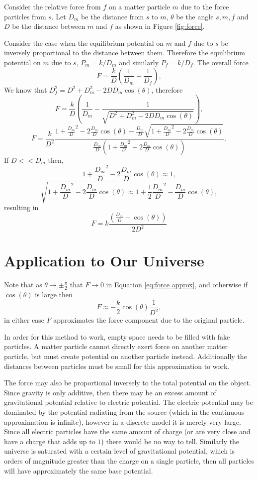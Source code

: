 \documentclass{article}
\begin{document}
Consider the relative force from $f$ on a matter particle $m$ due to the force particles from $s$.
Let $D_m$ be the distance from $s$ to $m$, $\theta$ be the angle $s, m, f$ and $D$ be the distance between $m$ and $f$ as shown in Figure \ref{fig:force}.

Consider the case when the equilibrium potential on $m$ and $f$ due to $s$ be inversely proportional to the distance between them.
Therefore the equilibrium potential on $m$ due to $s$, $P_m = k/D_m$ and similarly $P_f = k/D_f$.
The overall force
$$F = \frac{k}{D}\left(\frac{1}{D_m} - \frac{1}{D_f}\right),$$
We know that $D_f^2 = D^2 + D_m^2 - 2 D D_m \cos(\theta)$, therefore
$$F = \frac{k}{D}\left(\frac{1}{D_m} - \frac{1}{\sqrt{D^2 + D_m^2 - 2 D D_m \cos(\theta)}}\right),$$
$$F = \frac{k}{D^2}
\frac{1 + \frac{D_m}{D}^2 - 2 \frac{D_m}{D} \cos(\theta) - \frac{D_m}{D} \sqrt{1 + \frac{D_m}{D}^2 - 2 \frac{D_m}{D}\cos(\theta)}}
{\frac{D_m}{D}\left(1 + \frac{D_m}{D}^2 - 2 \frac{D_m}{D} \cos(\theta)\right)},
$$
If $D << D_m$ then,
$$1 + \frac{D_m}{D}^2 - 2 \frac{D_m}{D}\cos(\theta) \approx 1,$$
$$\sqrt{1 + \frac{D_m}{D}^2 - 2 \frac{D_m}{D}\cos(\theta)} \approx 1 + \frac{1}{2}\frac{D_m}{D}^2 - \frac{D_m}{D}\cos(\theta),$$
resulting in
\begin{equation}
F = k\frac{\left(\frac{D_m}{D} - \cos\left(\theta\right)\right)}{2D^2}
\label{eq:force approx}
\end{equation}

\section{Application to Our Universe}

Note that as $\theta \to \pm \frac{\pi}{2}$ that $F \to 0$ in Equation \ref{eq:force approx}, and otherwise if $\cos\left(\theta\right)$ is large then
$$F \approx -\frac{k}{2}\cos\left(\theta\right)\frac{1}{D^2},$$
in either case $F$ approximates the force component due to the original particle.

In order for this method to work, empty space needs to be filled with fake particles.
A matter particle cannot directly exert force on another matter particle, but must create potential on another particle instead.
Additionally the distances between particles must be small for this approximation to work.

The force may also be proportional inversely to the total potential on the object.
Since gravity is only additive, then there may be an excess amount of gravitational potential relative to electric potential.
The electric potential may be dominated by the potential radiating from the source (which in the continuous approximation is infinite), however in a discrete model it is merely very large.
Since all electric particles have the same amount of charge (or are very close and have a charge that adds up to $1$) there would be no way to tell.
Similarly the universe is saturated with a certain level of gravitational potential, which is orders of magnitude greater than the charge on a single particle, then all particles will have approximately the same base potential.
\end{document}

